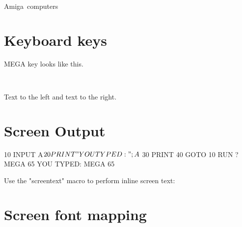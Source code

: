 Amiga\texttrademark \ computers

\section{Keyboard keys}

\megasymbolkey MEGA key looks like this.

\\

Text to the left  and text to the right.

    \megakey{ } 

\megakey{*} \megakey{$\leftarrow$} \megakey{$\uparrow$} \megakey{$\rightarrow$} \megakey{$\downarrow$}

\section{Screen Output}

\begin{screenoutput}
	10 INPUT A$
	20 PRINT "YOU TYPED: ";A$
	30 PRINT
	40 GOTO 10
	RUN
	? MEGA 65
	YOU TYPED: MEGA 65
\end{screenoutput}


Use the "screentext" macro to perform inline screen text:


\section{Screen font mapping}


